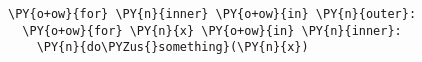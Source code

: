\begin{Verbatim}[commandchars=\\\{\}]
\PY{o+ow}{for} \PY{n}{inner} \PY{o+ow}{in} \PY{n}{outer}:
  \PY{o+ow}{for} \PY{n}{x} \PY{o+ow}{in} \PY{n}{inner}:
    \PY{n}{do\PYZus{}something}(\PY{n}{x})
\end{Verbatim}
